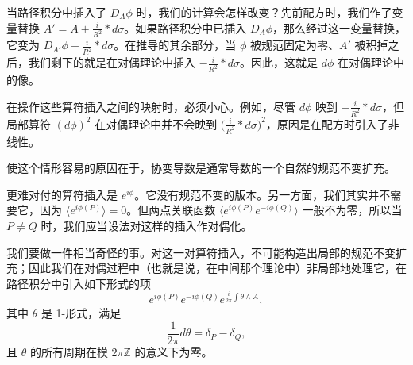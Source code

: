 当路径积分中插入了 $D_A\phi$ 时，我们的计算会怎样改变？先前配方时，我们作了变量替换 $A'=A+\frac{i}{R^2}\ast d\sigma$。如果路径积分中已插入 $D_A\phi$，那么经过这一变量替换，它变为 $D_{A'}\phi-\frac{i}{R^2}\ast d\sigma$。在推导的其余部分，当 $\phi$ 被规范固定为零、$A'$ 被积掉之后，我们剩下的就是在对偶理论中插入 $-\frac{i}{R^2}\ast d\sigma$。因此，这就是 $d\phi$ 在对偶理论中的像。

在操作这些算符插入之间的映射时，必须小心。例如，尽管 $d\phi$ 映到 $-\frac{i}{R^2}\ast d\sigma$，但局部算符 $(d\phi)^2$ 在对偶理论中并不会映到 $\bigl(\frac{i}{R^2}\ast d\sigma\bigr)^2$，原因是在配方时引入了非线性。


使这个情形容易的原因在于，协变导数是通常导数的一个自然的规范不变扩充。

更难对付的算符插入是 $e^{i\phi}$。它没有规范不变的版本。另一方面，我们其实并不需要它，因为 $\langle e^{i\phi(P)}\rangle=0$。但两点关联函数 $\langle e^{i\phi(P)}e^{-i\phi(Q)}\rangle$ 一般不为零，所以当 $P\ne Q$ 时，我们应当设法对这样的插入作对偶化。

我们要做一件相当奇怪的事。对这一对算符插入，不可能构造出局部的规范不变扩充；因此我们在对偶过程中（也就是说，在中间那个理论中）非局部地处理它，在路径积分中引入如下形式的项
\begin{equation}
  \tag{8.23}
  \label{eq:8-23}
  e^{i\phi(P)}e^{-i\phi(Q)}e^{\frac{i}{2\pi}\int\theta\wedge A},
\end{equation}
其中 $\theta$ 是 1-形式，满足
\begin{equation}
  \tag{8.24}
  \label{eq:8-24}
  \frac{1}{2\pi}d\theta=\delta_P-\delta_Q,
\end{equation}
且 $\theta$ 的所有周期在模 $2\pi\mathbb{Z}$ 的意义下为零。


